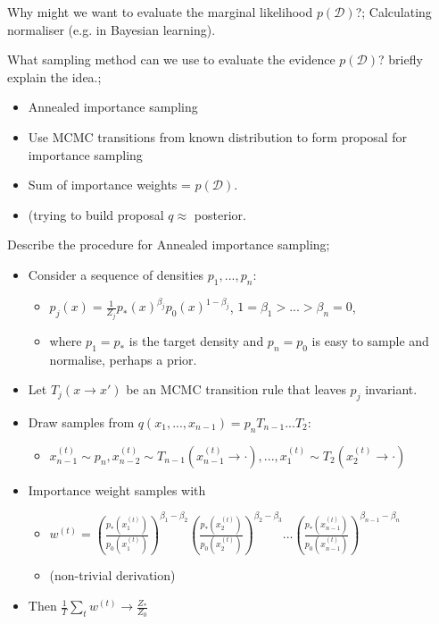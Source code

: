 \documentclass{article}
\begin{document}

Why might we want to evaluate the marginal likelihood $p(\mathcal{D})$?; Calculating normaliser (e.g. in Bayesian learning).

What sampling method can we use to evaluate the evidence $p(\mathcal{D})$? briefly explain the idea.; \begin{itemize}
    \item Annealed importance sampling
    \item Use MCMC transitions from known distribution to form proposal for importance sampling
    \item Sum of importance weights = $p(\mathcal{D})$.
    \item (trying to build proposal $q\approx$ posterior.
\end{itemize}

Describe the procedure for Annealed importance sampling; \begin{itemize}
    \item Consider a sequence of densities $p_1, ..., p_n$: \begin{itemize}
        \item $p_j(x) = \frac{1}{Z_j}p_*(x)^{\beta_j}p_0(x)^{1-\beta_j}$, $1=\beta_1 > ... > \beta_n = 0$,
        \item where $p_1 = p_*$ is the target density and $p_n = p_0$ is easy to sample and normalise, perhaps a prior.
    \end{itemize}
    \item Let $T_j(x\rightarrow x')$ be an MCMC transition rule that leaves $p_j$ invariant.
    \item Draw samples from $q(x_1,...,x_{n-1}) = p_nT_{n-1}...T_2$: \begin{itemize}
        \item $x_{n-1}^{(t)}\sim p_n, x^{(t)}_{n-2} \sim T_{n-1}(x^{(t)}_{n-1}\rightarrow \cdot ), ..., x^{(t)}_1\sim T_2(x_2^{(t)}\rightarrow \cdot)$
    \end{itemize}
    \item Importance weight samples with \begin{itemize}
        \item $w^{(t)} = (\frac{p_*(x_1^{(t)})}{p_0(x_1^{(t)})})^{\beta_1-\beta_2}(\frac{p_*(x_2^{(t)})}{p_0(x_2^{(t)})})^{\beta_2-\beta_3}...(\frac{p_*(x_{n-1}^{(t)})}{p_0(x_{n-1}^{(t)})})^{\beta_{n-1}-\beta_n}$
        \item (non-trivial derivation)
    \end{itemize}
    \item Then $\frac{1}{T}\sum_t w^{(t)} \rightarrow \frac{Z_*}{Z_0}$
\end{itemize}
\end{document}
